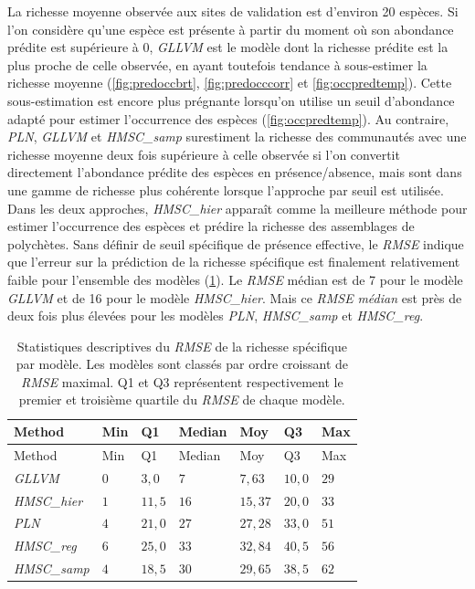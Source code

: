 \documentclass[12pt,]{article}
\begin{document}
La richesse moyenne observée aux sites de validation est d'environ 20
espèces. Si l'on considère qu'une espèce est présente à partir du moment
où son abondance prédite est supérieure à 0, \emph{GLLVM} est le modèle
dont la richesse prédite est la plus proche de celle observée, en ayant
toutefois tendance à sous-estimer la richesse moyenne
(\cref{fig:predoccbrt}, \cref{fig:predocccorr} et
\cref{fig:occpredtemp}). Cette sous-estimation est encore plus prégnante
lorsqu'on utilise un seuil d'abondance adapté pour estimer l'occurrence
des espèces (\cref{fig:occpredtemp}). Au contraire, \emph{PLN},
\emph{GLLVM} et \emph{HMSC\_samp} surestiment la richesse des
communautés avec une richesse moyenne deux fois supérieure à celle
observée si l'on convertit directement l'abondance prédite des espèces
en présence/absence, mais sont dans une gamme de richesse plus cohérente
lorsque l'approche par seuil est utilisée. Dans les deux approches,
\emph{HMSC\_hier} apparaît comme la meilleure méthode pour estimer
l'occurrence des espèces et prédire la richesse des assemblages de
polychètes. Sans définir de seuil spécifique de présence effective, le
\emph{RMSE} indique que l'erreur sur la prédiction de la richesse
spécifique est finalement relativement faible pour l'ensemble des
modèles (\cref{tbl:RMSEocc}). Le \emph{RMSE} médian est de 7 pour le
modèle \emph{GLLVM} et de 16 pour le modèle \emph{HMSC\_hier}. Mais ce
\emph{RMSE} \emph{médian} est près de deux fois plus élevées pour les
modèles \emph{PLN}, \emph{HMSC\_samp} et \emph{HMSC\_reg}.

{\small
\begin{longtable}[]{@{}lllllll@{}}
\caption{Statistiques descriptives du \emph{RMSE} de la richesse
spécifique par modèle. Les modèles sont classés par ordre croissant de
\emph{RMSE} maximal. Q1 et Q3 représentent respectivement le premier et
troisième quartile du \emph{RMSE} de chaque modèle.
\label{tbl:RMSEocc}}\tabularnewline
\toprule
Method & Min & Q1 & Median & Moy & Q3 & Max\tabularnewline
\midrule
\endfirsthead
\toprule
Method & Min & Q1 & Median & Moy & Q3 & Max\tabularnewline
\midrule
\endhead
\emph{GLLVM} & \(0\) & \(3,0\) & \(7\) & \(7,63\) & \(10,0\) &
\(29\)\tabularnewline
\emph{HMSC\_hier} & \(1\) & \(11,5\) & \(16\) & \(15,37\) & \(20,0\) &
\(33\)\tabularnewline
\emph{PLN} & \(4\) & \(21,0\) & \(27\) & \(27,28\) & \(33,0\) &
\(51\)\tabularnewline
\emph{HMSC\_reg} & \(6\) & \(25,0\) & \(33\) & \(32,84\) & \(40,5\) &
\(56\)\tabularnewline
\emph{HMSC\_samp} & \(4\) & \(18,5\) & \(30\) & \(29,65\) & \(38,5\) &
\(62\)\tabularnewline
\bottomrule
\end{longtable}}\FloatBarrier
\end{document}
